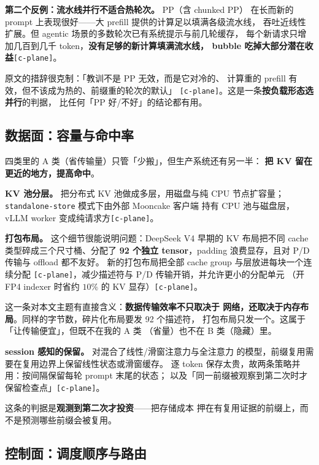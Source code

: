 \noindent\textbf{第二个反例：流水线并行不适合热轮次。} PP（含 chunked PP）
在长而新的 prompt 上表现很好——大 prefill 提供的计算足以填满各级流水线，
吞吐近线性扩展。但 agentic 场景的多数轮次已有系统提示与前几轮缓存，
每个新请求只增加几百到几千 token，\textbf{没有足够的新计算填满流水线，
bubble 吃掉大部分潜在收益}\texttt{[c-plane]}。

\noindent 原文的措辞很克制：「教训不是 PP 无效，而是它对冷的、
计算重的 prefill 有效，但不该成为热的、前缀重的轮次的默认」
\texttt{[c-plane]}。这是一条\textbf{按负载形态选并行}的判据，
比任何「PP 好/不好」的结论都有用。

\subsection{数据面：容量与命中率}

四类里的 A 类（省传输量）只管「少搬」，但生产系统还有另一半：
\textbf{把 KV 留在更近的地方，提高命中}。

\noindent\textbf{KV 池分层。} 把分布式 KV 池做成多层，用磁盘与纯 CPU
节点扩容量；\texttt{standalone-store} 模式下由外部 Mooncake 客户端
持有 CPU 池与磁盘层，vLLM worker 变成纯请求方\texttt{[c-plane]}。

\noindent\textbf{打包布局。} 这个细节很能说明问题：DeepSeek V4 早期的
KV 布局把不同 cache 类型碎成三个尺寸桶、分配了 \textbf{92 个独立
tensor}，padding 浪费显存，且对 P/D 传输与 offload 都不友好。
新的打包布局把全部 cache group 与层放进每块一个连续分配
\texttt{[c-plane]}，减少描述符与 P/D 传输开销，并允许更小的分配单元
（开 FP4 indexer 时省约 $10\%$ 的 KV 显存）\texttt{[c-plane]}。

\noindent 这一条对本文主题有直接含义：\textbf{数据传输效率不只取决于
网络，还取决于内存布局}。同样的字节数，碎片化布局要发 92 个描述符，
打包布局只发一个。这属于「让传输便宜」，但既不在我的 A 类
（省量）也不在 B 类（隐藏）里。

\noindent\textbf{session 感知的保留。} 对混合了线性/滑窗注意力与全注意力
的模型，前缀复用需要在复用边界上保留线性状态或滑窗缓存。
逐 token 保存太贵，故两条策略并用：按间隔保留每轮 prompt 末尾的状态；
以及「同一前缀被观察到第二次时才保留检查点」\texttt{[c-plane]}。

\noindent 这条的判据是\textbf{观测到第二次才投资}——把存储成本
押在有复用证据的前缀上，而不是预测哪些前缀会被复用。

\subsection{控制面：调度顺序与路由}

